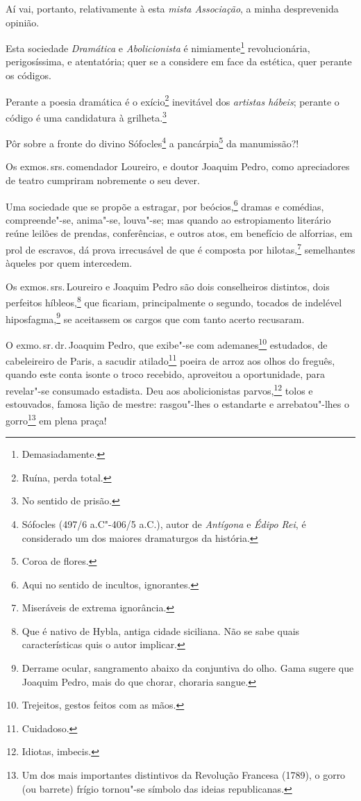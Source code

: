 Aí vai, portanto, relativamente à esta \emph{mista Associação}, a minha
desprevenida opinião.

Esta sociedade \emph{Dramática} e \emph{Abolicionista} é
nimiamente\footnote{Demasiadamente.} revolucionária, perigosíssima, e
atentatória; quer se a considere em face da estética, quer perante os
códigos.

Perante a poesia dramática é o exício\footnote{Ruína, perda total.}
inevitável dos \emph{artistas hábeis}; perante o código é uma
candidatura à grilheta.\footnote{No sentido de prisão.}

Pôr sobre a fronte do divino Sófocles\footnote{Sófocles (497/6
  a.C"-406/5 a.C.), autor de \emph{Antígona} e \emph{Édipo Rei}, é
  considerado um dos maiores dramaturgos da história.} a
pancárpia\footnote{Coroa de flores.} da manumissão?!

Os exmos.\,srs.\,comendador Loureiro, e doutor Joaquim Pedro, como
apreciadores de teatro cumpriram nobremente o seu dever.

Uma sociedade que se propõe a estragar, por beócios,\footnote{Aqui no
  sentido de incultos, ignorantes.} dramas e comédias, compreende"-se,
anima"-se, louva"-se; mas quando ao estropiamento literário reúne leilões
de prendas, conferências, e outros atos, em benefício de alforrias, em
prol de escravos, dá prova irrecusável de que é composta por
hilotas,\footnote{Miseráveis de extrema ignorância.} semelhantes
àqueles por quem intercedem.

Os exmos.\,srs.\,Loureiro e Joaquim Pedro são dois conselheiros distintos,
dois perfeitos híbleos,\footnote{Que é nativo de Hybla, antiga cidade
  siciliana. Não se sabe quais características quis o autor implicar.}
que ficariam, principalmente o segundo, tocados de indelével
hiposfagma,\footnote{Derrame ocular, sangramento abaixo da conjuntiva
  do olho. Gama sugere que Joaquim Pedro, mais do que chorar, choraria
  sangue.} se aceitassem os cargos que com tanto acerto recusaram.

O exmo.\,sr.\,dr.\,Joaquim Pedro, que exibe"-se com ademanes\footnote{
  Trejeitos, gestos feitos com as mãos.} estudados, de cabeleireiro de
Paris, a sacudir atilado\footnote{Cuidadoso.} poeira de arroz aos
olhos do freguês, quando este conta isonte o troco recebido, aproveitou
a oportunidade, para revelar"-se consumado estadista. Deu aos
abolicionistas parvos,\footnote{Idiotas, imbecis.} tolos e estouvados,
famosa lição de mestre: rasgou"-lhes o estandarte e arrebatou"-lhes o
gorro\footnote{Um dos mais importantes distintivos da Revolução
  Francesa (1789), o gorro (ou barrete) frígio tornou"-se símbolo das
  ideias republicanas.} em plena praça!

